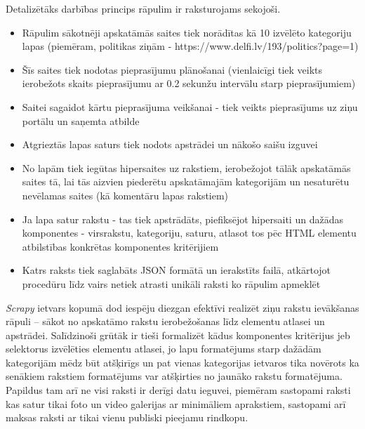 Detalizētāks darbības princips rāpulim ir raksturojams sekojoši.
\begin{itemize}
\item Rāpulim sākotnēji apskatāmās saites tiek norādītas kā 10 izvēlēto kategoriju lapas (piemēram, politikas ziņām - https://www.delfi.lv/193/politics?page=1)
\item Šīs saites tiek nodotas pieprasījumu plānošanai (vienlaicīgi tiek veikts ierobežots skaits pieprasījumu ar 0.2 sekunžu intervālu starp pieprasījumiem)
\item Saitei sagaidot kārtu pieprasījuma veikšanai - tiek veikts pieprasījums uz ziņu portālu un saņemta atbilde
\item Atgrieztās lapas saturs tiek nodots apstrādei un nākošo saišu izguvei
\item No lapām tiek iegūtas hipersaites uz rakstiem, ierobežojot tālāk apskatāmās saites tā, lai tās aizvien piederētu apskatāmajām kategorijām un nesaturētu nevēlamas saites (kā komentāru lapas rakstiem)
\item Ja lapa satur rakstu - tas tiek apstrādāts, piefiksējot hipersaiti un dažādas komponentes - virsrakstu, kategoriju, saturu, atlasot tos pēc HTML elementu atbilstības konkrētas komponentes kritērijiem
\item Katrs raksts tiek saglabāts JSON formātā un ierakstīts failā, atkārtojot procedūru līdz vairs netiek atrasti unikāli raksti ko rāpulim apmeklēt
\end{itemize}

\textit{Scrapy} ietvars kopumā dod iespēju diezgan efektīvi realizēt ziņu rakstu ievākšanas rāpuli – sākot no apskatāmo rakstu ierobežošanas līdz elementu atlasei un apstrādei. Salīdzinoši grūtāk ir tieši formalizēt kādus komponentes kritērijus jeb selektorus izvēlēties elementu atlasei, jo lapu formatējums starp dažādām kategorijām mēdz būt atšķirīgs un pat vienas kategorijas ietvaros tika novērots ka senākiem rakstiem formatējums var atšķirties no jaunāko rakstu formatējuma. Papildus tam arī ne visi raksti ir derīgi datu ieguvei, piemēram sastopami raksti kas satur tikai foto un video galerijas ar minimāliem aprakstiem, sastopami arī maksas raksti ar tikai vienu publiski pieejamu rindkopu.

